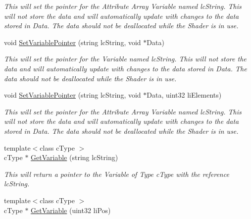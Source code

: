 \begin{DoxyCompactItemize}
\begin{DoxyCompactList}\small\item\em This will set the pointer for the Attribute Array Variable named lcString. This will not store the data and will automatically update with changes to the data stored in Data. The data should not be deallocated while the Shader is in use. \end{DoxyCompactList}\item 
\hypertarget{classc_render_object_a5b2c5a5e573530b243e1d1017bac0d80}{
void \hyperlink{classc_render_object_a5b2c5a5e573530b243e1d1017bac0d80}{SetVariablePointer} (string lcString, void $\ast$Data)}
\label{classc_render_object_a5b2c5a5e573530b243e1d1017bac0d80}

\begin{DoxyCompactList}\small\item\em This will set the pointer for the Variable named lcString. This will not store the data and will automatically update with changes to the data stored in Data. The data should not be deallocated while the Shader is in use. \end{DoxyCompactList}\item 
\hypertarget{classc_render_object_a6a5096bbe100657432f3d5d33cc837d3}{
void \hyperlink{classc_render_object_a6a5096bbe100657432f3d5d33cc837d3}{SetVariablePointer} (string lcString, void $\ast$Data, uint32 liElements)}
\label{classc_render_object_a6a5096bbe100657432f3d5d33cc837d3}

\begin{DoxyCompactList}\small\item\em This will set the pointer for the Attribute Array Variable named lcString. This will not store the data and will automatically update with changes to the data stored in Data. The data should not be deallocated while the Shader is in use. \end{DoxyCompactList}\item 
\hypertarget{classc_render_object_a2ef2b6f9daee8fe9c8f9c9cd65f4fea4}{
{\footnotesize template$<$class cType $>$ }\\cType $\ast$ \hyperlink{classc_render_object_a2ef2b6f9daee8fe9c8f9c9cd65f4fea4}{GetVariable} (string lcString)}
\label{classc_render_object_a2ef2b6f9daee8fe9c8f9c9cd65f4fea4}

\begin{DoxyCompactList}\small\item\em This will return a pointer to the Variable of Type cType with the reference lcString. \end{DoxyCompactList}\item 
\hypertarget{classc_render_object_a1a10a22c158e96f72a8971ae52f69f38}{
{\footnotesize template$<$class cType $>$ }\\cType $\ast$ \hyperlink{classc_render_object_a1a10a22c158e96f72a8971ae52f69f38}{GetVariable} (uint32 liPos)}
\label{classc_render_object_a1a10a22c158e96f72a8971ae52f69f38}


\end{DoxyCompactItemize}
